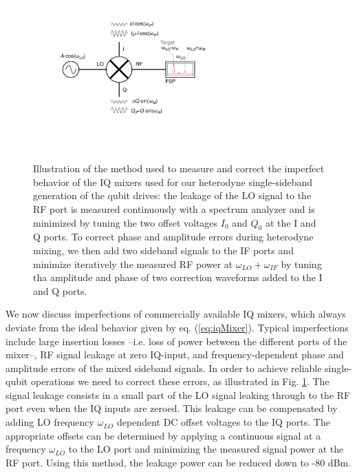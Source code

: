 \begin{figure}[ht!]
	\centering
		\includegraphics[width=0.7\textwidth]{"./material/figures/measurement/mixer_imperfections"}
	\caption[...]{Illustration of the method used to measure and correct the imperfect behavior of the IQ mixers used for  our heterodyne single-sideband generation of the qubit drives: the leakage of the LO signal to the RF port is measured continuously with a spectrum analyzer and is minimized by tuning the two offset voltages $I_0$ and $Q_0$ at the I and Q ports. To correct phase and amplitude errors during heterodyne mixing, we then add two sideband signals to the IF ports and minimize iteratively the measured RF power at $\omega_{LO}+\omega_{IF}$ by tuning tha amplitude and phase of two correction waveforms added to the I and Q ports.}
	\label{fig:iq_mixer_correction}
\end{figure}

We now discuss imperfections of commercially available IQ mixers, which always deviate from the ideal behavior given by eq. (\ref{eq:iqMixer}). Typical imperfections include large insertion losses --i.e. loss of  power between the different ports of the mixer--, RF signal leakage at zero IQ-input, and frequency-dependent phase and amplitude errors of the mixed sideband signals. In order to achieve reliable single-qubit operations we need to correct these errors, as illustrated in Fig. \ref{fig:iq_mixer_correction}. The signal leakage consists in a small part of the LO signal leaking through to the RF port even when the IQ inputs are zeroed. This leakage can be compensated by adding LO frequency $\omega_{LO}$ dependent DC offset voltages to the IQ ports. The appropriate offsets can be determined by applying a continuous signal at a frequency $\omega_{LO}$ to the LO port and minimizing the measured signal power at the RF port. Using this method, the leakage power can be reduced down to -80 dBm.

